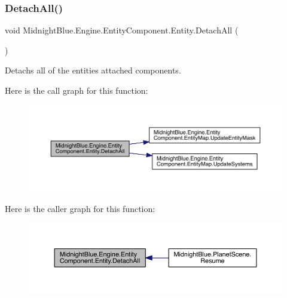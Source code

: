 \subsubsection{\texorpdfstring{Detach\+All()}{DetachAll()}}
{\footnotesize\ttfamily void Midnight\+Blue.\+Engine.\+Entity\+Component.\+Entity.\+Detach\+All (\begin{DoxyParamCaption}{ }\end{DoxyParamCaption})\hspace{0.3cm}{\ttfamily [inline]}}



Detachs all of the entities attached components. 

Here is the call graph for this function\+:
\nopagebreak
\begin{figure}[H]
\begin{center}
\leavevmode
\includegraphics[width=350pt]{class_midnight_blue_1_1_engine_1_1_entity_component_1_1_entity_a2109f26da3d9f33ff2ab950498e87782_cgraph}
\end{center}
\end{figure}
Here is the caller graph for this function\+:
\nopagebreak
\begin{figure}[H]
\begin{center}
\leavevmode
\includegraphics[width=350pt]{class_midnight_blue_1_1_engine_1_1_entity_component_1_1_entity_a2109f26da3d9f33ff2ab950498e87782_icgraph}
\end{center}
\end{figure}
\hypertarget{class_midnight_blue_1_1_engine_1_1_entity_component_1_1_entity_a897432decc39ee42eac559e88cab20a7}{}\label{class_midnight_blue_1_1_engine_1_1_entity_component_1_1_entity_a897432decc39ee42eac559e88cab20a7} 
